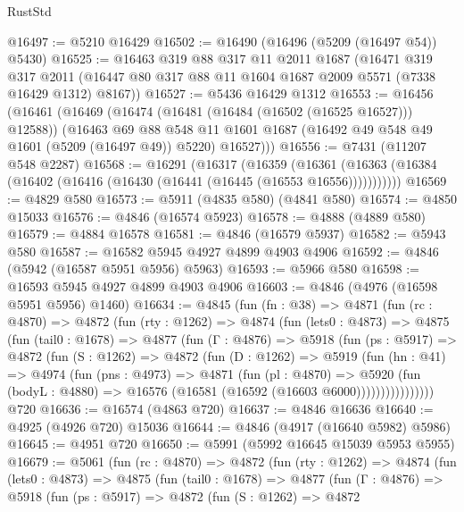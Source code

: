 \begin{lexlean}{RustStd}
\begin{coremodule}
@16497 := @5210 @16429
@16502 := @16490 (@16496 (@5209 (@16497 @54)) @5430)
@16525 := @16463
    @319
    @88
    @317
    @11
    @2011
    @1687
    (@16471
      @319
      @317
      @2011
      (@16447 @80 @317 @88 @11 @1604 @1687 @2009 @5571 (@7338 @16429 @1312) @8167))
@16527 := @5436 @16429 @1312
@16553 := @16456
    (@16461
      (@16469
        (@16474 (@16481 (@16484 (@16502 (@16525 @16527))) @12588))
        (@16463
          @69
          @88
          @548
          @11
          @1601
          @1687
          (@16492 @49 @548 @49 @1601 (@5209 (@16497 @49)) @5220)
          @16527)))
@16556 := @7431 (@11207 @548 @2287)
@16568 := @16291
    (@16317
      (@16359
        (@16361 (@16363 (@16384 (@16402 (@16416 (@16430 (@16441 (@16445 (@16553 @16556)))))))))))
@16569 := @4829 @580
@16573 := @5911 (@4835 @580) (@4841 @580)
@16574 := @4850 @15033
@16576 := @4846 (@16574 @5923)
@16578 := @4888 (@4889 @580)
@16579 := @4884 @16578
@16581 := @4846 (@16579 @5937)
@16582 := @5943 @580
@16587 := @16582 @5945 @4927 @4899 @4903 @4906
@16592 := @4846 (@5942 (@16587 @5951 @5956) @5963)
@16593 := @5966 @580
@16598 := @16593 @5945 @4927 @4899 @4903 @4906
@16603 := @4846 (@4976 (@16598 @5951 @5956) @1460)
@16634 := @4845
    (fun (fn : @38) =>
    @4871
      (fun (rc : @4870) =>
      @4872
        (fun (rty : @1262) =>
        @4874
          (fun (lets0 : @4873) =>
          @4875
            (fun (tail0 : @1678) =>
            @4877
              (fun (Γ : @4876) =>
              @5918
                (fun (ps : @5917) =>
                @4872
                  (fun (S : @1262) =>
                  @4872
                    (fun (D : @1262) =>
                    @5919
                      (fun (hn : @41) =>
                      @4974
                        (fun (pns : @4973) =>
                        @4871
                          (fun (pl : @4870) =>
                          @5920
                            (fun (bodyL : @4880) =>
                            @16576 (@16581 (@16592 (@16603 @6000))))))))))))))))
    @720
@16636 := @16574 (@4863 @720)
@16637 := @4846 @16636
@16640 := @4925 (@4926 @720) @15036
@16644 := @4846 (@4917 (@16640 @5982) @5986)
@16645 := @4951 @720
@16650 := @5991 (@5992 @16645 @15039 @5953 @5955)
@16679 := @5061
    (fun (rc : @4870) =>
    @4872
      (fun (rty : @1262) =>
      @4874
        (fun (lets0 : @4873) =>
        @4875
          (fun (tail0 : @1678) =>
          @4877
            (fun (Γ : @4876) =>
            @5918
              (fun (ps : @5917) =>
              @4872
                (fun (S : @1262) =>
                @4872

\end{coremodule}
\end{lexlean}
